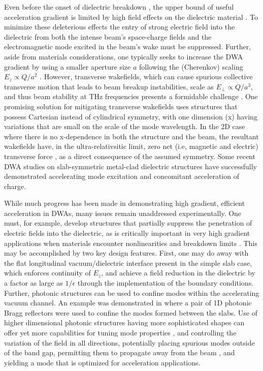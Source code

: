 \documentclass{article}
\begin{document}
Even before the onset of dielectric breakdown \cite{thompson2008}, the upper bound of useful acceleration gradient is limited by high field effects on the dielectric material \cite{OShea2016,dolgaleva2015}.  To minimize these deleterious effects the entry of strong electric field into the dielectric from both the intense beam's space-charge fields and the electromagnetic mode excited in the beam's wake must be suppressed. Further, aside from materials considerations, one typically seeks to increase the DWA  gradient by using a smaller aperture size $a$ following the  (Cherenkov) scaling $E_{z} \propto Q/a^2$  \cite{Tremaine1997,Barov2000}. However, transverse wakefields, which can cause spurious collective transverse motion that leads to beam breakup instabilities, scale as $E_{\perp} \propto Q/a^3$, and thus beam stability at THz frequencies presents a formidable challenge \cite{Li2014}. One promising solution for mitigating transverse wakefields uses structures that possess Cartesian instead of cylindrical symmetry, with one dimension (x) having variations that are small on the scale of the mode wavelength. In the 2D case where there is no x-dependence in both the structure and the beam, the resultant wakefields have, in the ultra-relativsitic limit, zero net (i.e, magnetic and electric) transverse force \cite{Tremaine1997}, as a direct consequence of the assumed symmetry. Some recent DWA studies on slab-symmetric metal-clad dielectric structures \cite{Andonian2012,Antipov2012} have successfully demonstrated accelerating mode excitation and concomitant acceleration of charge.

While much progress has been made in demonstrating high gradient, efficient acceleration in DWAs, many issues remain unaddressed experimentally. One must, for example, develop structures that partially suppress the penetration of electric fields into the dielectric, as is critically important in very high gradient applications when materials encounter nonlinearities and breakdown limits \cite{OShea2016,dolgaleva2015}. This may be accomplished by two key design features. First, one may do away with the flat longitudinal vacuum/dielectric interface present in the simple slab case, which enforces continuity of $E_z$, and achieve a field reduction in the dielectric by a factor as large as $1/\epsilon$ through the implementation of the boundary conditions. Further, photonic structures can be used to confine modes within the accelerating vacuum channel. An example was demonstrated in \cite{Andonian2014}  where a pair of 1D photonic Bragg reflectors were used to confine the modes formed between the slabs. Use of higher dimensional photonic structures having more sophisticated shapes can offer yet more capabilities for tuning mode properties \cite{Naranjo2012}, and controlling the variation of the field in all directions, potentially placing spurious modes outside of the band gap, permitting them to propagate away from the beam \cite{Smirnova2005a}, and yielding a mode that is optimized for acceleration applications.  
\end{document}
